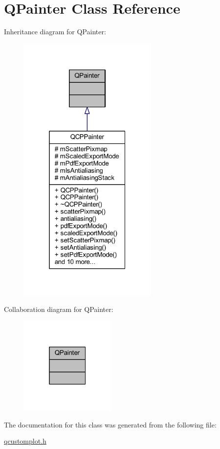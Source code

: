 \hypertarget{a00060}{\section{Q\+Painter Class Reference}
\label{a00060}
}


Inheritance diagram for Q\+Painter\+:
\nopagebreak
\begin{figure}[H]
\begin{center}
\leavevmode
\includegraphics[width=196pt]{d4/d79/a00540}
\end{center}
\end{figure}


Collaboration diagram for Q\+Painter\+:
\nopagebreak
\begin{figure}[H]
\begin{center}
\leavevmode
\includegraphics[width=135pt]{dd/d72/a00541}
\end{center}
\end{figure}


The documentation for this class was generated from the following file\+:\begin{DoxyCompactItemize}
\item 
\hyperlink{a00116}{qcustomplot.\+h}\end{DoxyCompactItemize}
